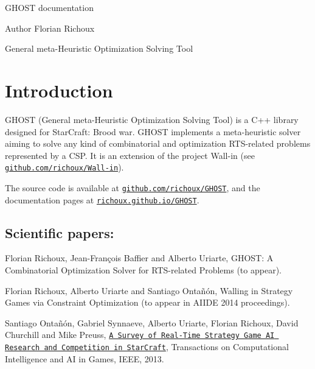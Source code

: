 G\-H\-O\-S\-T documentation \begin{DoxyAuthor}{Author}
Florian Richoux
\end{DoxyAuthor}
General meta-\/\-Heuristic Optimization Solving Tool

\section*{Introduction }

G\-H\-O\-S\-T (General meta-\/\-Heuristic Optimization Solving Tool) is a C++ library designed for Star\-Craft\-: Brood war. G\-H\-O\-S\-T implements a meta-\/heuristic solver aiming to solve any kind of combinatorial and optimization R\-T\-S-\/related problems represented by a C\-S\-P. It is an extension of the project Wall-\/in (see \href{https://github.com/richoux/Wall-in}{\tt github.\-com/richoux/\-Wall-\/in}).

The source code is available at \href{https://github.com/richoux/GHOST}{\tt github.\-com/richoux/\-G\-H\-O\-S\-T}, and the documentation pages at \href{http://richoux.github.io/GHOST}{\tt richoux.\-github.\-io/\-G\-H\-O\-S\-T}.

\subsection*{Scientific papers\-: }


\begin{DoxyItemize}
\item Florian Richoux, Jean-\/\-François Baffier and Alberto Uriarte, G\-H\-O\-S\-T\-: A Combinatorial Optimization Solver for R\-T\-S-\/related Problems (to appear).
\item Florian Richoux, Alberto Uriarte and Santiago Ontañón, Walling in Strategy Games via Constraint Optimization (to appear in A\-I\-I\-D\-E 2014 proceedings).
\item Santiago Ontañón, Gabriel Synnaeve, Alberto Uriarte, Florian Richoux, David Churchill and Mike Preuss, \href{http://pagesperso.lina.univ-nantes.fr/~richoux-f/publications/tciaig13.pdf}{\tt A Survey of Real-\/\-Time Strategy Game A\-I Research and Competition in Star\-Craft}, Transactions on Computational Intelligence and A\-I in Games, I\-E\-E\-E, 2013. 
\end{DoxyItemize}